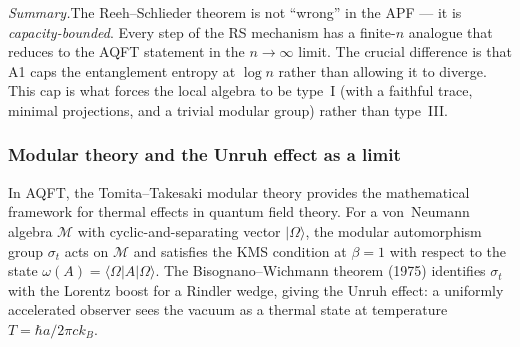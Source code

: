 \documentclass[11pt,a4paper]{article}
\theoremstyle{definition}
\begin{document}
\noindent\textit{Summary.}\quad The Reeh--Schlieder theorem is not
``wrong'' in the APF --- it is \emph{capacity-bounded}.  Every step
of the RS mechanism has a finite-$n$ analogue that reduces to the
AQFT statement in the $n \to \infty$ limit.  The crucial difference
is that A1 caps the entanglement entropy at $\log n$ rather than
allowing it to diverge.  This cap is what forces the local algebra to
be type~I (with a faithful trace, minimal projections, and a trivial
modular group) rather than type~III.


\subsubsection{Modular theory and the Unruh effect as a limit}
\label{sec:modular_bridge}

In AQFT, the Tomita--Takesaki modular theory provides the mathematical
framework for thermal effects in quantum field theory.  For a von~Neumann
algebra $\mathcal{M}$ with cyclic-and-separating vector $|\Omega\rangle$,
the modular automorphism group $\sigma_t$ acts on $\mathcal{M}$ and
satisfies the KMS condition at $\beta = 1$ with respect to the state
$\omega(A) = \langle\Omega|A|\Omega\rangle$.  The Bisognano--Wichmann
theorem (1975) identifies $\sigma_t$ with the Lorentz boost for a
Rindler wedge, giving the Unruh effect: a uniformly accelerated
observer sees the vacuum as a thermal state at temperature
$T = \hbar a / 2\pi c k_B$.
\end{document}

